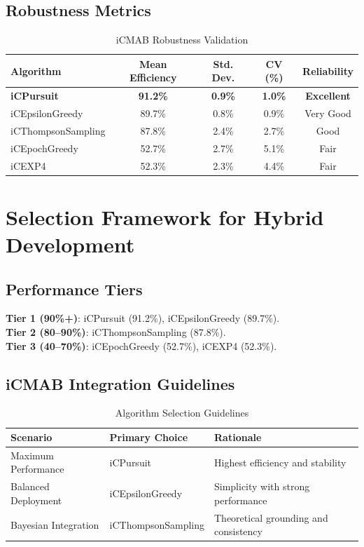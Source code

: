 \documentclass[12pt,a4paper]{article}
\newcommand{\success}[1]{\textcolor{accentgreen}{\textbf{#1}}}
\begin{document}
\subsection{Robustness Metrics}
\begin{table}[H]
\centering
\caption{iCMAB Robustness Validation}
\begin{tabular}{@{}lcccc@{}}
\toprule
\textbf{Algorithm} & \textbf{Mean Efficiency} & \textbf{Std. Dev.} & \textbf{CV (\%)} & \textbf{Reliability} \\
\midrule
\success{iCPursuit} & \success{91.2\%} & \success{0.9\%} & \success{1.0\%} & \success{Excellent} \\
iCEpsilonGreedy & 89.7\% & 0.8\% & 0.9\% & Very Good \\
iCThompsonSampling & 87.8\% & 2.4\% & 2.7\% & Good \\
iCEpochGreedy & 52.7\% & 2.7\% & 5.1\% & Fair \\
iCEXP4 & 52.3\% & 2.3\% & 4.4\% & Fair \\
\bottomrule
\end{tabular}
\end{table}

\section{Selection Framework for Hybrid Development}

\subsection{Performance Tiers}
\textbf{Tier 1 (90\%+)}: iCPursuit (91.2\%), iCEpsilonGreedy (89.7\%).\\
\textbf{Tier 2 (80–90\%)}: iCThompsonSampling (87.8\%).\\
\textbf{Tier 3 (40–70\%)}: iCEpochGreedy (52.7\%), iCEXP4 (52.3\%).

\subsection{iCMAB Integration Guidelines}
\begin{table}[H]
\centering
\caption{Algorithm Selection Guidelines}
\begin{tabular}{@{}lll@{}}
\toprule
\textbf{Scenario} & \textbf{Primary Choice} & \textbf{Rationale} \\
\midrule
Maximum Performance & iCPursuit & Highest efficiency and stability \\
Balanced Deployment & iCEpsilonGreedy & Simplicity with strong performance \\
Bayesian Integration & iCThompsonSampling & Theoretical grounding and consistency \\
\bottomrule
\end{tabular}
\end{table}
\end{document}
